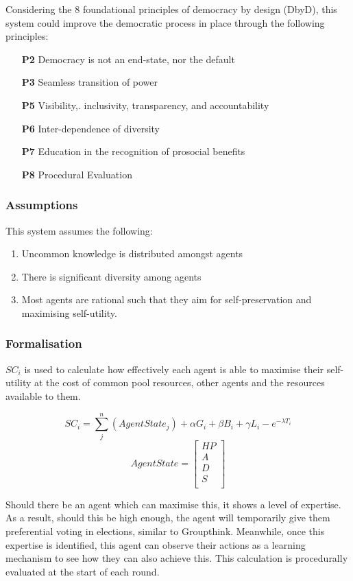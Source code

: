 Considering the 8 foundational principles of democracy by design (DbyD), this system could improve the democratic process in place through the following principles: \cite{Jpitt}
    \begin{enumerate}
        \item[\textbf{P2}] Democracy is not an end-state, nor the default
        \item[\textbf{P3}]Seamless transition of power
        \item[\textbf{P5}] Visibility,. inclusivity, transparency, and accountability
        \item[\textbf{P6}] Inter-dependence of diversity 
        \item[\textbf{P7}] Education in the recognition of prosocial benefits
        \item[\textbf{P8}] Procedural Evaluation
    \end{enumerate}
\subsubsection{Assumptions}
This system assumes the following:

\begin{enumerate}
    \item Uncommon knowledge is distributed amongst agents
    \item There is significant diversity among agents
    \item Most agents are rational such that they aim for self-preservation and maximising self-utility.
\end{enumerate}

\subsubsection{Formalisation}
$SC_i$ is used to calculate how effectively each agent is able to maximise their self-utility at the cost of common pool resources, other agents and the resources available to them. 


$$SC_i = \sum_{j}^{n} (AgentState_j) + \alpha G_i + \beta B_i + \gamma L_i - e^{-\lambda T_i}$$
$$ AgentState = 
\begin{bmatrix}
HP\\
A\\
D \\
S \\
\end{bmatrix}
$$

Should there be an agent which can maximise this, it shows a level of expertise. As a result, should this be high enough, the agent will temporarily give them preferential voting in elections, similar to Groupthink. Meanwhile, once this expertise is identified, this agent can observe their actions as a learning mechanism to see how they can also achieve this. This calculation is procedurally evaluated at the start of each round.

